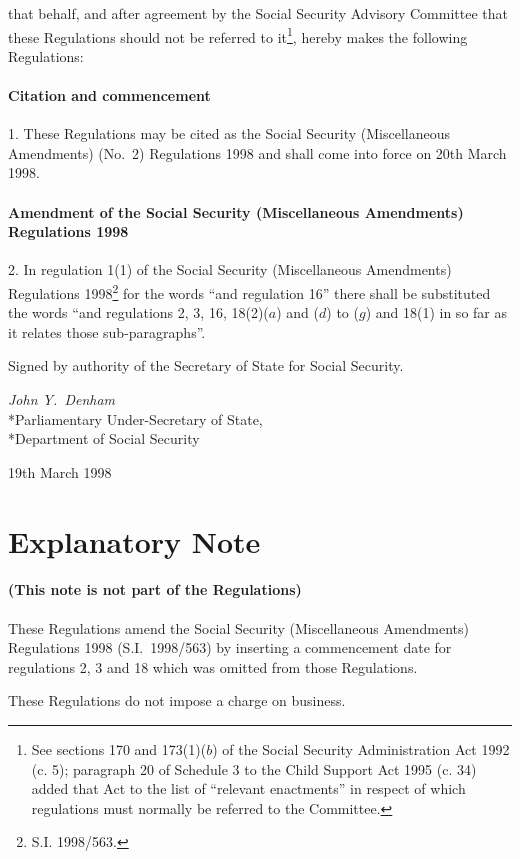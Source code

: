 \documentclass[12pt,a4paper]{article}
\begin{document}
that behalf, and after agreement by the Social Security Advisory Committee that these Regulations should not be referred to it\footnote{\frenchspacing See sections 170 and 173(1)($b$) of the Social Security Administration Act 1992 (c. 5); paragraph 20 of Schedule 3 to the Child Support Act 1995 (c. 34) added that Act to the list of “relevant enactments” in respect of which regulations must normally be referred to the Committee.}, hereby makes the following Regulations:  


{\sloppy

\tableofcontents

}

\setcounter{secnumdepth}{-2}

\subsection[1. Citation and commencement]{Citation and commencement}

1.  These Regulations may be cited as the Social Security (Miscellaneous Amendments) (No.\ 2) Regulations 1998 and shall come into force on 20th March 1998.

\subsection[2. Amendment of the Social Security (Miscellaneous Amendments) Regulations 1998]{Amendment of the Social Security (Miscellaneous Amendments) Regulations 1998}

2.  In regulation 1(1) of the Social Security (Miscellaneous Amendments) Regulations 1998\footnote{\frenchspacing S.I. 1998/563.} for the words “and regulation 16” there shall be substituted the words “and regulations 2, 3, 16, 18(2)($a$)  and ($d$)  to ($g$)  and 18(1) in so far as it relates those sub-paragraphs”. 

\bigskip

Signed by authority of the Secretary of State for Social Security.

{\raggedleft
\emph{John Y.~Denham}\\*Parliamentary Under-Secretary of
State,\\*Department of Social Security

}

19th March 1998

\small

\part{Explanatory Note}

\renewcommand\parthead{--- Explanatory Note}

\subsection*{(This note is not part of the Regulations)}

These Regulations amend the Social Security (Miscellaneous Amendments) Regulations 1998 (S.I.\ 1998/563) by inserting a commencement date for regulations 2, 3 and 18 which was omitted from those Regulations.

These Regulations do not impose a charge on business. 
\end{document}
